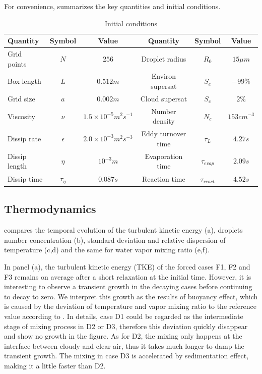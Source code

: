For convenience,  summarizes the key quantities and initial conditions.
\begin{table}[!htbp]
\centering
\begin{adjustbox}{max width = \textwidth}
\begin{tabular}{l c c c c c}
\hline\hline
Quantity & Symbol & Value & Quantity & Symbol & Value\\
\hline
Grid points & $N$ & $256$ & Droplet radius & $R_{0}$ & $15\mu m$\\
Box length & $L$ & $0.512m$ & Environ supersat & $S_{e}$ & $-99\%$\\
Grid size & $a$ & $0.002m$ & Cloud supersat & $S_{c}$ & $2\%$\\
Viscosity & $\nu$ & $1.5\times10^{-5}m^{2}s^{-1}$ & Number density& $N_{c}$ & $153cm^{-3}$\\
Dissip rate& $\epsilon$ & $2.0\times10^{-3}m^{2}s^{-3}$ & Eddy turnover time & $\tau_{L}$ & $4.27s$\\
Dissip length& $\eta$ & $10^{-3}m$ & Evaporation time & $\tau_{evap}$ & $2.09s$\\
Dissip time& $\tau_{\eta}$ & $0.087s$ & Reaction time & $\tau_{react}$ & $4.52s$\\
\hline
\end{tabular}
\end{adjustbox}
\caption{Initial conditions}
\label{tb:parameters}
\end{table}

\subsection{Thermodynamics}
 compares the temporal evolution of the turbulent kinetic
energy (a), droplets number concentration (b), standard deviation and relative
dispersion of temperature (c,d) and the same for water vapor mixing ratio
(e,f).

In panel (a), the turbulent kinetic energy (TKE) of the forced cases F1, F2 and
F3 remains on average after a short relaxation at the initial time. However, it
is interesting to observe a transient growth in the decaying cases before
continuing to decay to zero. We interpret this growth as the results of
buoyancy effect, which is caused by the deviation of temperature and vapor
mixing ratio to the reference value according to . In
details, case D1 could be regarded as the intermediate stage of mixing process
in D2 or D3, therefore this deviation quickly disappear and show no growth in
the figure. As for D2, the mixing only happens at the interface between cloudy
and clear air, thus it takes much longer to damp the transient growth. The
mixing in case D3 is accelerated by sedimentation effect, making it a little
faster than D2.

